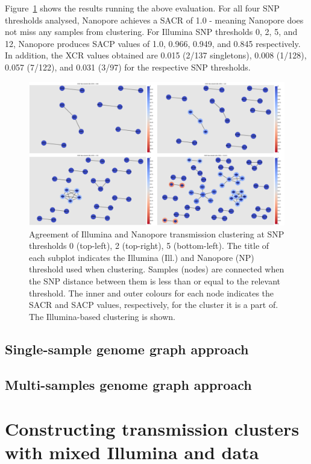 Figure~{\ref{827243}} shows the results running the
above evaluation. For all four SNP thresholds analysed, Nanopore
achieves a SACR of 1.0 - meaning Nanopore does not miss any samples from
clustering. For Illumina SNP thresholds 0, 2, 5, and 12, Nanopore
produces SACP values of 1.0, 0.966, 0.949, and 0.845 respectively. In
addition, the XCR values obtained are 0.015 (2/137 singletons), 0.008
(1/128), 0.057 (7/122), and 0.031 (3/97) for the respective SNP
thresholds.~


\begin{figure}
\begin{center}
\includegraphics[width=0.70\columnwidth]{Chapter2/Figs/bcftools_clusters.png}
\caption{{Agreement of Illumina and Nanopore transmission clustering at SNP
thresholds 0 (top-left), 2 (top-right), 5 (bottom-left). The title of
each subplot indicates the Illumina (Ill.) and Nanopore (NP) threshold
used when clustering. Samples (nodes) are connected when the SNP
distance between them is less than or equal to the relevant threshold.
The inner and outer colours for each node indicates the SACR and SACP
values, respectively, for the cluster it is a part of. The
Illumina-based clustering is shown.
{\label{827243}}%
}}
\end{center}
\end{figure}

\subsection{Single-sample genome graph approach}

\subsection{Multi-samples genome graph approach}


\section{Constructing transmission clusters with mixed Illumina and \ont{} data}

